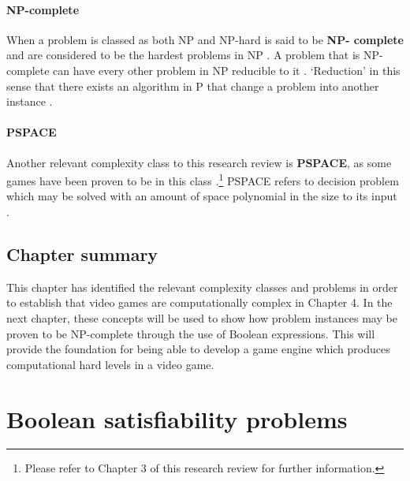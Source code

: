 \documentclass[11pt, a4paper, oneside]{report} %
\begin{document}
\subsubsection{NP-complete}

When a problem is classed as both NP and NP-hard is said to be \textbf{NP-
complete} and are considered to be the hardest problems in NP
\cite{sipser2012introduction,Goldreich:2008,kendall2008survey,du2011theory}. A
problem that is NP- complete can have every other problem in NP reducible to it
\cite{papadimitriou2003computational}. `Reduction' in this sense that there
exists an algorithm in P that change a problem into another instance
\cite{du2011theory}.

\subsubsection{PSPACE} 

Another relevant complexity class to this research review is \textbf{PSPACE}, as
some games have been proven to be in this class \cite{DBLP:conf/fun/Forisek10,
demaine2002push}.\footnote{Please refer to Chapter 3 of this research review for
further information.} PSPACE refers to decision problem which may be solved with
an amount of space polynomial in the size to its input
\cite{sipser2012introduction}.

\section{Chapter summary}

This chapter has identified the relevant complexity classes and problems in
order to establish that video games are computationally complex in Chapter 4. In
the next chapter, these concepts will be used to show how problem instances may
be proven to be NP-complete through the use of Boolean expressions. This will
provide the foundation for being able to develop a game engine which produces
computational hard levels in a video game.



\chapter{Boolean satisfiability problems}
\end{document}

